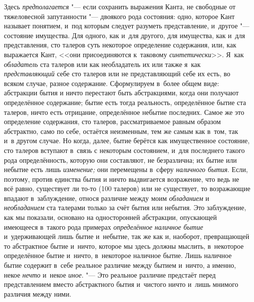 Здесь {\em предполагается} "--- если сохранить выражения Канта, не свободные от
тяжеловесной запутанности "--- двоякого рода состояния: одно, которое Кант
называет понятием, и~под которым следует разуметь представление, и~другое "---
состояние имущества. Для одного, как и~для другого, для имущества, как и~для
представления, сто талеров суть некоторое определение содержания, или, как
выражается Кант, <<они присоединяются к~таковому {\em синтетически}>>. Я~как
{\em обладатель} ста талеров или как необладатель их или также я~как {\em
представляющий} себе сто талеров или не представляющий себе их есть, во всяком
случае, разное содержание. Сформулируем в~более общем виде: абстракции бытия и
ничто перестают быть абстракциями, когда они получают определённое содержание;
бытие есть тогда реальность, определённое бытие ста талеров, ничто есть
отрицание, определённое небытие последних. Самое же это определение содержания,
сто талеров, рассматриваемое равным образом абстрактно, само по себе, остаётся
неизменным, тем же самым как в~том, так и~в другом случае. Но когда, далее,
бытие берётся как имущественное состояние, сто талеров вступают в~связь с
некоторым состоянием, и~для последнего такого рода определённость, которую они
составляют, не безразлична; их бытие или небытие есть лишь {\em изменение;} они
перемещены в~сферу {\em наличного бытия}. Если, поэтому, против единства бытия
и ничто выдвигается возражение, что ведь не всё равно, существует ли то-то (100
талеров) или не существует, то возражающие впадают в~заблуждение, относя
различие между моим {\em обладанием} и {\em необладанием} ста талерами только
за счёт бытия или небытия. Это заблуждение, как мы показали, основано на
односторонней абстракции, опускающей имеющееся в~такого рода примерах {\em
определённое наличное бытие} и~удерживающей лишь бытие и~небытие, так же как и,
наоборот, превращающей то абстрактное бытие и~ничто, которое мы здесь должны
мыслить, в~некоторое определённое бытие и~ничто, в~некоторое наличное бытие.
Лишь наличное бытие содержит в~себе реальное различие между бытием и~ничто, а
именно, некое {\em нечто} и~некое {\em иное}. "--- Это реальное различие
предстаёт перед представлением вместо абстрактного бытия и~чистого ничто и~лишь
мнимого различия между ними.

